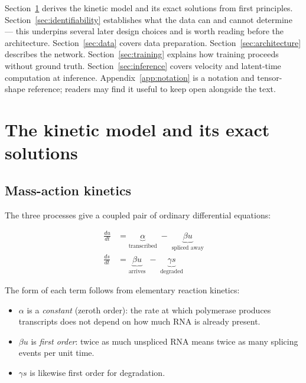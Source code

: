 \documentclass[11pt,a4paper]{article}
\newenvironment{keybox}{\begin{shaded}\noindent}{\end{shaded}}
\newcommand{\uns}{u}
\newcommand{\spl}{s}
\theoremstyle{definition}
\begin{document}
Section~\ref{sec:kinetics} derives the kinetic model and its exact solutions
from first principles. Section~\ref{sec:identifiability} establishes what the
data can and cannot determine --- this underpins several later design choices
and is worth reading before the architecture. Section~\ref{sec:data} covers
data preparation. Section~\ref{sec:architecture} describes the network.
Section~\ref{sec:training} explains how training proceeds without ground truth.
Section~\ref{sec:inference} covers velocity and latent-time computation at
inference. Appendix~\ref{app:notation} is a notation and tensor-shape
reference; readers may find it useful to keep open alongside the text.

\section{The kinetic model and its exact solutions}
\label{sec:kinetics}

\subsection{Mass-action kinetics}

The three processes give a coupled pair of ordinary differential equations:
%
\begin{keybox}
\begin{align}
\frac{d\uns}{dt} &= \underbrace{\alpha}_{\text{transcribed}} \;-\; \underbrace{\beta \uns}_{\text{spliced away}}
\label{eq:ode-u}\\[0.4em]
\frac{d\spl}{dt} &= \underbrace{\beta \uns}_{\text{arrives}} \;-\; \underbrace{\gamma \spl}_{\text{degraded}}
\label{eq:ode-s}
\end{align}
\end{keybox}
%
The form of each term follows from elementary reaction kinetics:

\begin{itemize}[leftmargin=*]
\item $\alpha$ is a \emph{constant} (zeroth order): the rate at which
      polymerase produces transcripts does not depend on how much RNA is
      already present.
\item $\beta \uns$ is \emph{first order}: twice as much unspliced RNA means
      twice as many splicing events per unit time.
\item $\gamma \spl$ is likewise first order for degradation.
\end{itemize}
\end{document}
